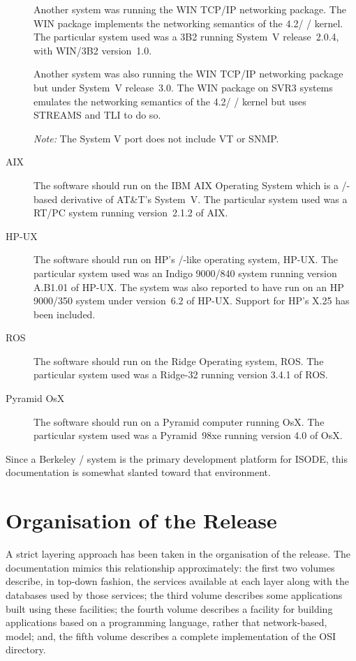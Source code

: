 \begin{description}
Another system was running the WIN TCP/IP networking package.
The WIN package implements the networking semantics of the 4.2\bsd/ \unix/
kernel.
The particular system used was a 3B2 running System~V release~2.0.4,
with WIN/3B2 version~1.0.

Another system was also running the WIN TCP/IP networking package
but under System~V release~3.0.
The WIN package on SVR3 systems emulates the networking semantics of the
4.2\bsd/ \unix/ kernel but uses STREAMS and TLI to do so.

{\em Note:} The System V port does not include VT or SNMP.

\item	[AIX]
The software should run on the IBM AIX Operating System
which is a \unix/-based derivative of AT\&T's System~V.
The particular system used was a RT/PC system running version~2.1.2
of AIX.

\item	[HP-UX]
The software should run on HP's \unix/-like operating system, HP-UX.
The particular system used was an Indigo 9000/840 system running version
A.B1.01 of HP-UX.
The system was also reported to have run on an HP 9000/350 system under
version~6.2 of HP-UX.
Support for HP's X.25 has been included.

\item	[ROS]
The software should run on the Ridge Operating system, ROS.
The particular system used was a Ridge-32 running version 3.4.1 of ROS.

\item	[Pyramid OsX]
The software should run on a Pyramid computer running OsX.
The particular system used was a Pyramid~98xe running version 4.0 of OsX.
\end{description}

Since a Berkeley \unix/ system is the primary development platform for ISODE,
this documentation is somewhat slanted toward that environment.

\section	{Organisation of the Release}
A strict layering approach has been taken in the organisation of the release.
The documentation mimics this relationship approximately:
the first two volumes describe,
in top-down fashion,
the services available at each layer along with the databases used by those
services;
the third volume describes some applications built using these facilities;
the fourth volume describes a facility for building applications based on a
programming language, rather that network-based, model;
and,
the fifth volume describes a complete implementation of the OSI directory.

